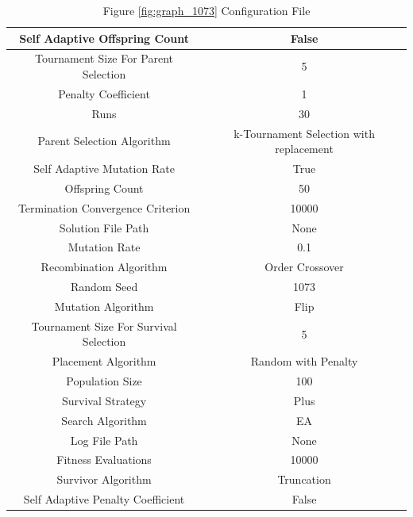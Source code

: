 \documentclass{standalone}
\begin{document}
\begin{table}[!htb]
	\centering
	\caption{Figure \ref{fig:graph_1073} Configuration File}
	\label{tab:graph_1073}
	\begin{tabular}{| c | c |}
		\hline
		Self Adaptive Offspring Count		& False		 \\
		\hline
		Tournament Size For Parent Selection		& 5		 \\
		\hline
		Penalty Coefficient		& 1		 \\
		\hline
		Runs		& 30		 \\
		\hline
		Parent Selection Algorithm		& k-Tournament Selection with replacement		 \\
		\hline
		Self Adaptive Mutation Rate		& True		 \\
		\hline
		Offspring Count		& 50		 \\
		\hline
		Termination Convergence Criterion		& 10000		 \\
		\hline
		Solution File Path		& None		 \\
		\hline
		Mutation Rate		& 0.1		 \\
		\hline
		Recombination Algorithm		& Order Crossover		 \\
		\hline
		Random Seed		& 1073		 \\
		\hline
		Mutation Algorithm		& Flip		 \\
		\hline
		Tournament Size For Survival Selection		& 5		 \\
		\hline
		Placement Algorithm		& Random with Penalty		 \\
		\hline
		Population Size		& 100		 \\
		\hline
		Survival Strategy		& Plus		 \\
		\hline
		Search Algorithm		& EA		 \\
		\hline
		Log File Path		& None		 \\
		\hline
		Fitness Evaluations		& 10000		 \\
		\hline
		Survivor Algorithm		& Truncation		 \\
		\hline
		Self Adaptive Penalty Coefficient		& False		 \\
		\hline
	\end{tabular}
\end{table}
\end{document}
